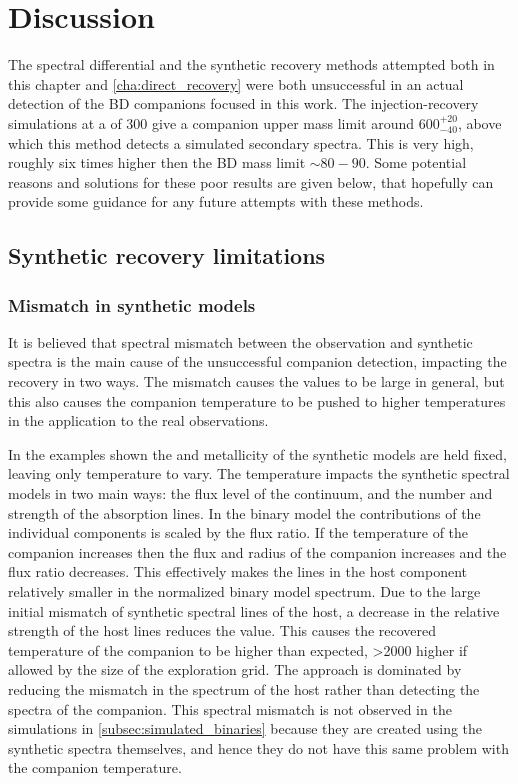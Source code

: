 
\section{Discussion}
\label{sec:chisquared_discussion}
The spectral differential and the synthetic recovery methods attempted both in this chapter and \cref{cha:direct_recovery} were both unsuccessful in an actual detection of the {BD} companions focused in this work.
The injection-recovery simulations at a \snr{} of 300 give a companion upper mass limit around \(600^{+20}_{-40}\), above which this method detects a simulated secondary spectra. This is very high, roughly six times higher then the {BD} mass limit \(\sim 80-90\)\Mjup{}.
Some potential reasons and solutions for these poor results are given below, that hopefully can provide some guidance for any future attempts with these methods.

\subsection{Synthetic recovery limitations}
\label{subsec:limitations}

\subsubsection{Mismatch in synthetic models}
\label{subsubsec:mismatch}
It is believed that spectral mismatch between the observation and synthetic spectra is the main cause of the unsuccessful companion detection, impacting the recovery in two ways.
The mismatch causes the \textchisquared{} values to be large in general, but this also causes the companion temperature to be pushed to higher temperatures in the application to the real observations.

In the examples shown the \logg{} and metallicity of the synthetic models are held fixed, leaving only temperature to vary.
The temperature impacts the synthetic spectral models in two main ways: the flux level of the continuum, and the number and strength of the absorption lines.
In the binary model the contributions of the individual components is scaled by the flux ratio. If the temperature of the companion increases then the flux and radius of the companion increases and the flux ratio \FoneFtwo{} decreases.
This effectively makes the lines in the host component relatively smaller in the normalized binary model spectrum.
Due to the large initial mismatch of synthetic spectral lines of the host, a decrease in the relative strength of the host lines reduces the \textchisquared{} value.
This causes the recovered temperature of the companion to be higher than expected, >2000\K{} higher if allowed by the size of the exploration grid.
The \textchisquared{} approach is dominated by reducing the mismatch in the spectrum of the host rather than detecting the spectra of the companion.
This spectral mismatch is not observed in the simulations in \cref{subsec:simulated_binaries} because they are created using the synthetic spectra themselves, and hence they do not have this same problem with the companion temperature.

